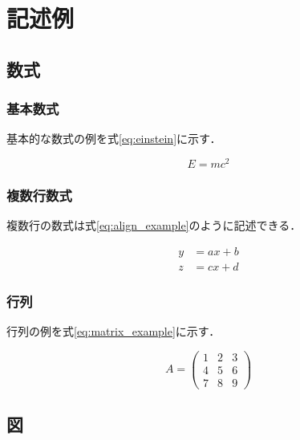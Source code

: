 
\chapter{記述例}
\label{chap:examples}

\section{数式}
\label{sec:math}

\subsection{基本数式}

基本的な数式の例を式\ref{eq:einstein}に示す．

\begin{equation}
    E = mc^2
    \label{eq:einstein}
\end{equation}

\subsection{複数行数式}

複数行の数式は式\ref{eq:align_example}のように記述できる．

\begin{align}
    y &= ax + b \\
    z &= cx + d
    \label{eq:align_example}
\end{align}

\subsection{行列}

行列の例を式\ref{eq:matrix_example}に示す．

\begin{equation}
    A =
    \begin{pmatrix}
        1 & 2 & 3 \\
        4 & 5 & 6 \\
        7 & 8 & 9
    \end{pmatrix}
    \label{eq:matrix_example}
\end{equation}

\section{図}
\label{sec:figure}

